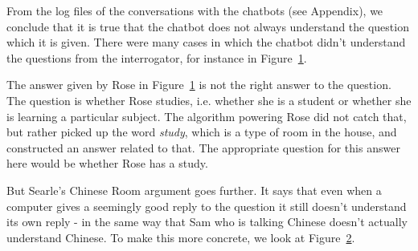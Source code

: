 From the log files of the conversations with the chatbots (see Appendix), we conclude that it is true that the chatbot does not always understand the question which it is given. There were many cases in which the chatbot didn't understand the questions from the interrogator, for instance in Figure~\ref{Example1}.

\begin{figure}[ht]
   \begin{center}
   \end{center}
   \caption{}
   \label{Example1}
\end{figure}

The answer given by Rose in Figure~\ref{Example1} is not the right answer to the question. The question is whether Rose studies, i.e. whether she is a student or whether she is learning a particular subject. The algorithm powering Rose did not catch that, but rather picked up the word \textit{study}, which is a type of room in the house, and constructed an answer related to that. The appropriate question for this answer here would be whether Rose has a study.

But Searle's Chinese Room argument goes further. It says that even when a computer gives a seemingly good reply to the question it still doesn't understand its own reply - in the same way that Sam who is talking Chinese doesn't actually understand Chinese. To make this more concrete, we look at Figure~\ref{Example2}.

\begin{figure}[ht]
   \begin{center}
   \end{center}
   \caption{}
   \label{Example2}
\end{figure}

